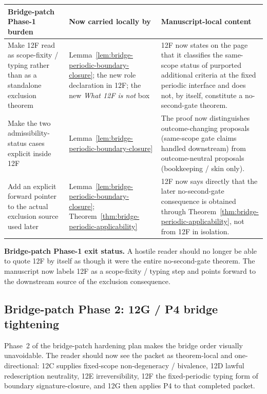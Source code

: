 \begin{center}
\footnotesize
\renewcommand{\arraystretch}{1.16}
\setlength{\tabcolsep}{4pt}
\begin{tabularx}{0.98\textwidth}{@{}L{0.31\textwidth}L{0.24\textwidth}Y@{}}
\toprule
\textbf{Bridge-patch Phase-1 burden} & \textbf{Now carried locally by} & \textbf{Manuscript-local content}\\
\midrule
Make 12F read as scope-fixity / typing rather than as a standalone exclusion theorem & Lemma~\ref{lem:bridge-periodic-boundary-closure}; the new role declaration in 12F; the new \emph{What 12F is not} box & 12F now states on the page that it classifies the same-scope status of purported additional criteria at the fixed periodic interface and does not, by itself, constitute a no-second-gate theorem.\\
Make the two admissibility-status cases explicit inside 12F & Lemma~\ref{lem:bridge-periodic-boundary-closure} & The proof now distinguishes outcome-changing proposals (same-scope gate claims handled downstream) from outcome-neutral proposals (bookkeeping / skin only).\\
Add an explicit forward pointer to the actual exclusion source used later & Lemma~\ref{lem:bridge-periodic-boundary-closure}; Theorem~\ref{thm:bridge-periodic-applicability} & 12F now says directly that the later no-second-gate consequence is obtained through Theorem~\ref{thm:bridge-periodic-applicability}, not from 12F in isolation.\\
\bottomrule
\end{tabularx}
\end{center}

\noindent\textbf{Bridge-patch Phase-1 exit status.} A hostile reader should no longer be able to quote 12F by itself as though it were the entire no-second-gate theorem. The manuscript now labels 12F as a scope-fixity / typing step and points forward to the downstream source of the exclusion consequence.

\subsection*{Bridge-patch Phase 2: 12G / P4 bridge tightening}
Phase~2 of the bridge-patch hardening plan makes the bridge order visually unavoidable. The reader should now see the packet as theorem-local and one-directional: 12C supplies fixed-scope non-degeneracy / bivalence, 12D lawful redescription neutrality, 12E irreversibility, 12F the fixed-periodic typing form of boundary signature-closure, and 12G then applies P4 to that completed packet.

